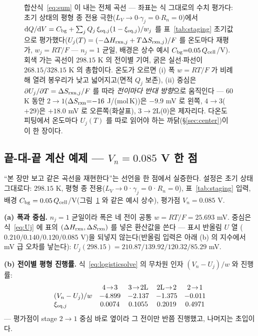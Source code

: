 \begin{figure}[t]
\caption{합산식~\eqref{eq:sum} 이 내는 전체 곡선 --- 좌표는 식 그대로의 수치 평가다: 초기 상태의 평형
종 전용 극한($L_V\!\to\!0$$\cdot$$\gamma_j{=}0$$\cdot$$R_n{=}0$)에서
$\mathrm{d} Q/\mathrm{d} V=C_{\mathrm{bg}}+\sum_jQ_j\,\xi_{\mathrm{eq},j}(1-\xi_{\mathrm{eq},j})/w_j$ 를 표~\ref{tab:staging} 초기값으로
평가했다($U_j(T)=(-\Delta H_{\mathrm{rxn},j}+T\Delta S_{\mathrm{rxn},j})/F$ 를 온도마다 재평가, $w_j{=}RT/F$
--- $n_j{=}1$ 균일, 배경은 상수 예시 $C_{\mathrm{bg}}{=}0.05\,Q_{\mathrm{cell}}$/V). 회색 가는 곡선이 $298.15$ K 의
전이별 기여, 굵은 실선$\cdot$파선이 $268.15/328.15$ K 의 총합이다. 온도가 오르면 (i) 폭
$w{=}RT/F$ 가 비례해 열려 봉우리가 낮고 넓어지고(면적 $Q_j$ 보존), (ii) 중심은
$\partial U_j/\partial T=\Delta S_{\mathrm{rxn},j}/F$ 를 따라 \emph{전이마다 반대 방향}으로 움직인다 ---
$60$ K 동안 $2\!\to\!1$($\Delta S_{\mathrm{rxn}}{=}{-}16$ J/(mol\,K))은 $-9.9$ mV 로 왼쪽,
$4\!\to\!3$($+29$)은 $+18.0$ mV 로 오른쪽(화살표), $3\!\to\!2\mathrm L$($0$)은 제자리다. 다온도
피팅에서 온도마다 $U_j(T)$ 를 따로 읽어야 하는 까닭(\S\ref{sec:center})이 이 한 장이다.}
\label{fig:sumcurve}
\end{figure}

\subsection{끝-대-끝 계산 예제 --- $V_n=0.085$ V 한 점}\label{sec:sum-worked}
``본 장만 보고 같은 곡선을 재현한다''는 선언을 한 점에서 실증한다. 설정은 초기 상태 그대로다:
$298.15$ K, 평형 종 전용($L_V\!\to\!0$·$\gamma_j{=}0$·$R_n{=}0$), 표~\ref{tab:staging} 입력,
배경 $C_{\mathrm{bg}}=0.05\,Q_{\mathrm{cell}}$/V(그림~\ref{fig:sumcurve} 와 같은 예시 상수), 평가점 $V_n=0.085$ V.

\textbf{(a) 폭과 중심.} $n_j{=}1$ 균일이라 폭은 네 전이 공통 $w=RT/F=25.693$ mV. 중심은
식~\eqref{eq:Uj} 에 표의 $(\Delta H_{\mathrm{rxn}},\Delta S_{\mathrm{rxn}})$ 를 넣은 환산값을 쓴다 --- 표시 반올림 $U$ 열
($0.210/0.140/0.120/0.085$ V)을 되넣지 않는다(반올림 입력은 아래 (b) 의 지수에서 mV 급 오차를 낳는다):
$U_j(298.15)=210.87/139.92/120.32/85.29$ mV.

\textbf{(b) 전이별 평형 진행률.} 식~\eqref{eq:logisticsolve} 의 무차원 인자 $(V_n-U_j)/w$ 와 진행률:
\[
\begin{array}{lcccc}
 & 4\!\to\!3 & 3\!\to\!2\mathrm L & 2\mathrm L\!\to\!2 & 2\!\to\!1\\
(V_n-U_j)/w & -4.899 & -2.137 & -1.375 & -0.011\\
\xi_{\eq,j} & 0.0074 & 0.1055 & 0.2019 & 0.4971
\end{array}
\]
--- 평가점이 stage $2\!\to\!1$ 중심 바로 옆이라 그 전이만 반쯤 진행했고, 나머지는 초입이다.

